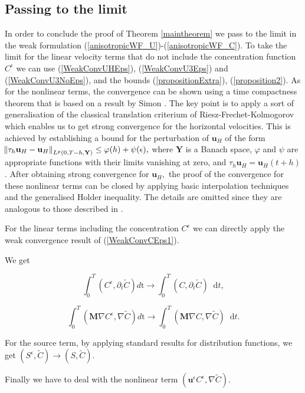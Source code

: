 \documentclass[11pt]{article}
\newcommand*\diff{\mathop{}\!\mathrm{d}}
\begin{document}
\subsection{Passing to the limit}

    In order to conclude the proof of Theorem \ref{maintheorem} we pass to the limit in the weak formulation (\ref{anisotropicWF_U})-(\ref{anisotropicWF_C}). To take the limit for the linear velocity terms that do not include the concentration function $C^\epsilon$ we can use (\ref{WeakConvUHEps}), (\ref{WeakConvU3Eps}) and (\ref{WeakConvU3NoEps}), and the bounds (\ref{propositionExtra}), (\ref{proposition2}). As for the nonlinear terms, the convergence can be shown using a time compactness theorem that is based on a result by Simon \cite{simon1986compact}. The key point is to apply a sort of generalisation of the classical translation criterium of Riesz-Frechet-Kolmogorov which enables us to get strong convergence for the horizontal velocities. This is achieved by establishing a bound for the perturbation of $\mathbf{u}_H$ of the form $\norm{\tau_h \mathbf{u}_H - \mathbf{u}_H}_{L^p(0,T-h, \mathbf{Y})} \leq \varphi(h) + \psi(\epsilon),$ where $\mathbf{Y}$ is a Banach space, $\varphi$ and $\psi$ are appropriate functions with their limits vanishing at zero, and $\tau_h \mathbf{u}_H = \mathbf{u}_H (t+h) $. After obtaining strong convergence for $\mathbf{u}_H,$ the proof of the convergence for these nonlinear terms can be closed by applying basic interpolation techniques and the generalised Holder inequality. The details are omitted since they are analogous to those described in \cite{azerad2001mathematical}.
  
    For the linear terms including the concentration $C^\epsilon$ we can directly apply the weak convergence result of (\ref{WeakConvCEps1}).
    
    We get
    
    \[ \int_0 ^ T (C^\epsilon , \partial_t \tilde{C}) d \mathrm{t} \to \int_0^T (C, \partial_t \tilde{C}) \diff t,\]
    
    \[ \int_0 ^ T  (\mathbf{M} \nabla C^\epsilon, \nabla \tilde{C}) d \mathrm{t} \to \int_0^T (\mathbf{M} \nabla C, \nabla \tilde{C}) \diff t.\]
      
    For the source term, by applying standard results for distribution functions, we get $(S^\epsilon, \tilde{C}) \to  (S, \tilde{C}).$ 
      
Finally we have to deal with the nonlinear term $(\mathbf{u}^\epsilon C^\epsilon, \nabla \tilde{C}).$
  
\end{document}
